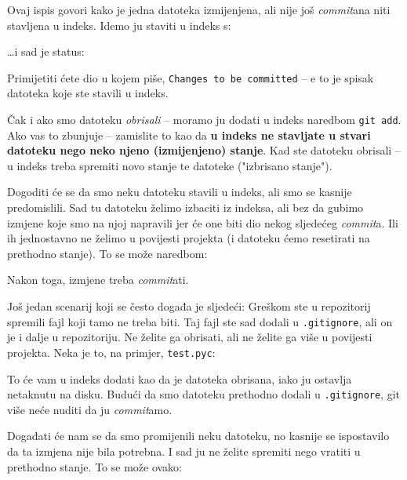 

Ovaj ispis govori kako je jedna datoteka izmijenjena, ali nije još \emph{commit}ana niti stavljena u indeks.
Idemo ju staviti u indeks s:


\dots{}i sad je status:



Primijetiti ćete dio u kojem piše, \texttt{Changes to be committed} -- e to je spisak datoteka koje ste stavili u indeks.

Čak i ako smo datoteku \emph{obrisali} -- moramo ju dodati u indeks naredbom \verb+git add+.
Ako vas to zbunjuje -- zamislite to kao da \textbf{u indeks ne stavljate u stvari datoteku nego neko njeno (izmijenjeno) stanje}.
Kad ste datoteku obrisali -- u indeks treba spremiti novo stanje te datoteke ("izbrisano stanje").

Dogoditi će se da smo neku datoteku stavili u indeks, ali smo se kasnije predomislili. 
Sad tu datoteku želimo izbaciti iz indeksa, ali bez da gubimo izmjene koje smo na njoj napravili jer će one biti dio nekog sljedećeg \emph{commit}a.
Ili ih jednostavno ne želimo u povijesti projekta (i datoteku ćemo resetirati na prethodno stanje).
To se može naredbom:


Nakon toga, izmjene treba \emph{commit}ati.

Još jedan scenarij koji se često događa je sljedeći:
Greškom ste u repozitorij spremili fajl koji tamo ne treba biti. 
Taj fajl ste sad dodali u \verb+.gitignore+, ali on je i dalje u repozitoriju. 
Ne želite ga obrisati, ali ne želite ga više u povijesti projekta.
Neka je to, na primjer, \verb+test.pyc+:


To će vam u indeks dodati kao da je datoteka obrisana, iako ju ostavlja netaknutu na disku.
Budući da smo datoteku prethodno dodali u \verb+.gitignore+, git više neće nuditi da ju \emph{commit}amo.

Događati će nam se da smo promijenili neku datoteku, no kasnije se ispostavilo da ta izmjena nije bila potrebna. 
I sad ju ne želite spremiti nego vratiti u prethodno stanje.
To se može ovako:



